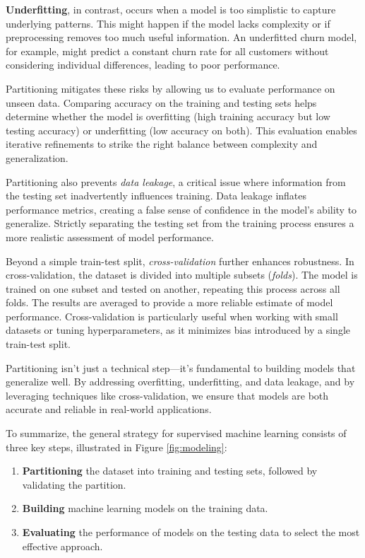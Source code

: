 \documentclass[
  11pt,
]{book}
\providecommand{\tightlist}{%
  \setlength{\itemsep}{0pt}\setlength{\parskip}{0pt}}
\theoremstyle{definition}
\theoremstyle{definition}
\theoremstyle{definition}
\theoremstyle{definition}
\theoremstyle{remark}
\begin{document}
\textbf{Underfitting}, in contrast, occurs when a model is too simplistic to capture underlying patterns. This might happen if the model lacks complexity or if preprocessing removes too much useful information. An underfitted churn model, for example, might predict a constant churn rate for all customers without considering individual differences, leading to poor performance.

Partitioning mitigates these risks by allowing us to evaluate performance on unseen data. Comparing accuracy on the training and testing sets helps determine whether the model is overfitting (high training accuracy but low testing accuracy) or underfitting (low accuracy on both). This evaluation enables iterative refinements to strike the right balance between complexity and generalization.

Partitioning also prevents \emph{data leakage}, a critical issue where information from the testing set inadvertently influences training. Data leakage inflates performance metrics, creating a false sense of confidence in the model's ability to generalize. Strictly separating the testing set from the training process ensures a more realistic assessment of model performance.

Beyond a simple train-test split, \emph{cross-validation} further enhances robustness. In cross-validation, the dataset is divided into multiple subsets (\emph{folds}). The model is trained on one subset and tested on another, repeating this process across all folds. The results are averaged to provide a more reliable estimate of model performance. Cross-validation is particularly useful when working with small datasets or tuning hyperparameters, as it minimizes bias introduced by a single train-test split.

Partitioning isn't just a technical step---it's fundamental to building models that generalize well. By addressing overfitting, underfitting, and data leakage, and by leveraging techniques like cross-validation, we ensure that models are both accurate and reliable in real-world applications.

To summarize, the general strategy for supervised machine learning consists of three key steps, illustrated in Figure \ref{fig:modeling}:

\begin{enumerate}
\def\labelenumi{\arabic{enumi}.}
\tightlist
\item
  \textbf{Partitioning} the dataset into training and testing sets, followed by validating the partition.
\item
  \textbf{Building} machine learning models on the training data.
\item
  \textbf{Evaluating} the performance of models on the testing data to select the most effective approach.
\end{enumerate}
\end{document}
